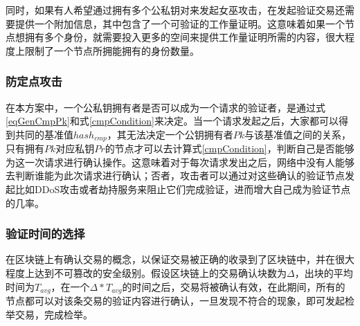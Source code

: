 同时，如果有人希望通过拥有多个公私钥对来发起女巫攻击，在发起验证交易还需要提供一个附加信息，其中包含了一个可验证的工作量证明。这意味着如果一个节点想拥有多个身份，就需要投入更多的空间来提供工作量证明所需的内容，很大程度上限制了一个节点所拥能拥有的身份数量。                          

\subsubsection{防定点攻击}

在本方案中，一个公私钥拥有者是否可以成为一个请求的验证者，是通过式\ref{eqGenCmpPk}和式\ref{cmpCondition}来决定。当一个请求发起之后，大家都可以得到共同的基准值$hash_{cmp}$，其无法决定一个公钥拥有者$Pk$与该基准值之间的关系，只有拥有$Pk$对应私钥$Pr$的节点才可以去计算式\ref{cmpCondition}，判断自己是否能够为这一次请求进行确认操作。这意味着对于每次请求发出之后，网络中没有人能够去判断谁能为此次请求进行确认；否者，攻击者可以通过对这些确认的验证节点发起比如DDoS攻击或者劫持服务来阻止它们完成验证，进而增大自己成为验证节点的几率。

\subsubsection{验证时间的选择}

在区块链上有确认交易的概念，以保证交易被正确的收录到了区块链中，并在很大程度上达到不可篡改的安全级别\supercite{nakamoto2008bitcoin}。假设区块链上的交易确认块数为$\Delta$，出块的平均时间为$T_{avg}$，在一个$\Delta*T_{avg}$的时间之后，交易将被确认有效，在此期间，所有的节点都可以对该条交易的验证内容进行确认，一旦发现不符合的现象，即可发起检举交易，完成检举。







